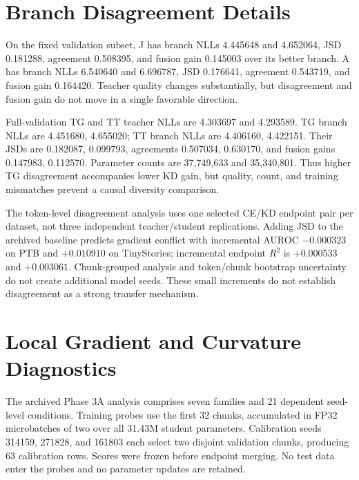 \section{Branch Disagreement Details}\label{app:branch-diagnostics}

On the fixed validation subset, J has branch NLLs 4.445648 and 4.652064, JSD 0.181288, agreement 0.508395, and fusion gain 0.145003 over its better branch. A has branch NLLs 6.540640 and 6.696787, JSD 0.176641, agreement 0.543719, and fusion gain 0.164420. Teacher quality changes substantially, but disagreement and fusion gain do not move in a single favorable direction.

Full-validation TG and TT teacher NLLs are 4.303697 and 4.293589. TG branch NLLs are 4.451680, 4.655020; TT branch NLLs are 4.406160, 4.422151. Their JSDs are 0.182087, 0.099793, agreements 0.507034, 0.630170, and fusion gains 0.147983, 0.112570. Parameter counts are 37,749,633 and 35,340,801. Thus higher TG disagreement accompanies lower KD gain, but quality, count, and training mismatches prevent a causal diversity comparison.

The token-level disagreement analysis uses one selected CE/KD endpoint pair per dataset, not three independent teacher/student replications. Adding JSD to the archived baseline predicts gradient conflict with incremental AUROC $-0.000323$ on PTB and $+0.010910$ on TinyStories; incremental endpoint $R^2$ is $+0.000533$ and $+0.003061$. Chunk-grouped analysis and token/chunk bootstrap uncertainty do not create additional model seeds. These small increments do not establish disagreement as a strong transfer mechanism.

\section{Local Gradient and Curvature Diagnostics}\label{app:local-diagnostics}

The archived Phase 3A analysis comprises seven families and 21 dependent seed-level conditions. Training probes use the first 32 chunks, accumulated in FP32 microbatches of two over all 31.43M student parameters. Calibration seeds 314159, 271828, and 161803 each select two disjoint validation chunks, producing 63 calibration rows. Scores were frozen before endpoint merging. No test data enter the probes and no parameter updates are retained.

